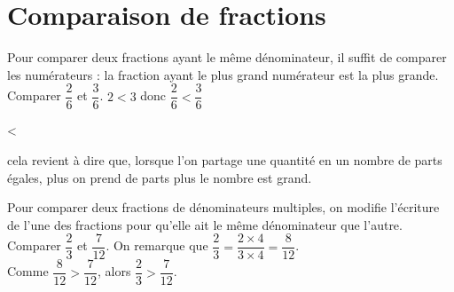 \section{Comparaison de fractions}

\begin{methode}
   Pour comparer deux fractions ayant le même dénominateur, il suffit de comparer les numérateurs : la fraction ayant le plus grand numérateur est la plus grande.
   \exercice \smallskip
      Comparer $\dfrac26$ et $\dfrac36$.
   \correction \smallskip
      $2<3$ donc $\dfrac26<\dfrac36$ \quad \parbox{1.4cm}{} < \parbox{1.2cm}{}
\end{methode}

\begin{remarque}
   cela revient à dire que, lorsque l'on partage une quantité en un nombre de parts égales, plus on prend de parts plus le nombre est grand.
\end{remarque}


\begin{methode}
   Pour comparer deux fractions de dénominateurs multiples, on modifie l'écriture de l'une des fractions pour qu'elle ait le même dénominateur que l'autre.
   \exercice \smallskip
   Comparer $\dfrac23$ et $\dfrac{7}{12}$.
   \correction
   On remarque que $\dfrac23=\dfrac{2\times4}{3\times4}=\dfrac{8}{12}$. \\ [1mm]
      Comme $\dfrac{8}{12}>\dfrac{7}{12}$, alors $\dfrac23>\dfrac{7}{12}$.
\end{methode}



\exercicesbase

